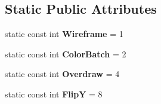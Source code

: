 \subsection*{Static Public Attributes}
\begin{DoxyCompactItemize}
\item 
\hypertarget{class_u_i_renderer_a6472e56938d0e576e6e49f55f53355d1}{static const int {\bfseries Wireframe} = 1}\label{class_u_i_renderer_a6472e56938d0e576e6e49f55f53355d1}

\item 
\hypertarget{class_u_i_renderer_a1936b4d333e8b4dcbfc8ae7842d7831b}{static const int {\bfseries Color\-Batch} = 2}\label{class_u_i_renderer_a1936b4d333e8b4dcbfc8ae7842d7831b}

\item 
\hypertarget{class_u_i_renderer_a063e1e52cf61320266f44049db712ed5}{static const int {\bfseries Overdraw} = 4}\label{class_u_i_renderer_a063e1e52cf61320266f44049db712ed5}

\item 
\hypertarget{class_u_i_renderer_a0b81268994fe6323c3489d148d9c2a69}{static const int {\bfseries Flip\-Y} = 8}\label{class_u_i_renderer_a0b81268994fe6323c3489d148d9c2a69}

\end{DoxyCompactItemize}
